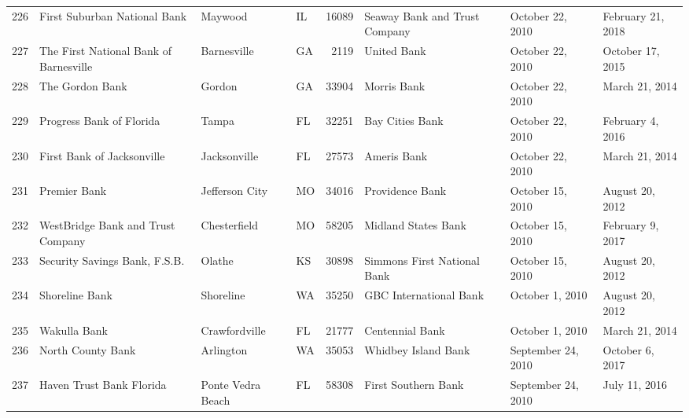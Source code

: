 \begin{tabular}{llllrlll}
226 &                       First Suburban National Bank &             Maywood &  IL &  16089 &                      Seaway Bank and Trust Company &    October 22, 2010 &   February 21, 2018 \\
227 &             The First National Bank of Barnesville &         Barnesville &  GA &   2119 &                                        United Bank &    October 22, 2010 &    October 17, 2015 \\
228 &                                    The Gordon Bank &              Gordon &  GA &  33904 &                                        Morris Bank &    October 22, 2010 &      March 21, 2014 \\
229 &                           Progress Bank of Florida &               Tampa &  FL &  32251 &                                    Bay Cities Bank &    October 22, 2010 &    February 4, 2016 \\
230 &                         First Bank of Jacksonville &        Jacksonville &  FL &  27573 &                                        Ameris Bank &    October 22, 2010 &      March 21, 2014 \\
231 &                                       Premier Bank &      Jefferson City &  MO &  34016 &                                    Providence Bank &    October 15, 2010 &     August 20, 2012 \\
232 &                  WestBridge Bank and Trust Company &        Chesterfield &  MO &  58205 &                                Midland States Bank &    October 15, 2010 &    February 9, 2017 \\
233 &                      Security Savings Bank, F.S.B. &              Olathe &  KS &  30898 &                        Simmons First National Bank &    October 15, 2010 &     August 20, 2012 \\
234 &                                     Shoreline Bank &           Shoreline &  WA &  35250 &                             GBC International Bank &     October 1, 2010 &     August 20, 2012 \\
235 &                                       Wakulla Bank &       Crawfordville &  FL &  21777 &                                    Centennial Bank &     October 1, 2010 &      March 21, 2014 \\
236 &                                  North County Bank &           Arlington &  WA &  35053 &                                Whidbey Island Bank &  September 24, 2010 &     October 6, 2017 \\
237 &                           Haven Trust Bank Florida &   Ponte Vedra Beach &  FL &  58308 &                                First Southern Bank &  September 24, 2010 &       July 11, 2016 \\

\end{tabular}
